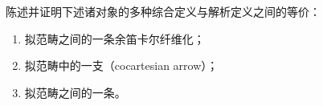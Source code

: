 \begin{exercise}\label{ex:cocartesian-equivalences}
陈述并证明下述诸对象的多种综合定义与解析定义之间的等价：
\begin{enumerate}[label=(\roman*)]
\item 拟范畴之间的一条余笛卡尔纤维化；
\item 拟范畴中的一支\trCocartesianArrow（cocartesian arrow）；
\item 拟范畴之间的一条\trDiscreteCocartesianFibration。
\end{enumerate}
\end{exercise}

